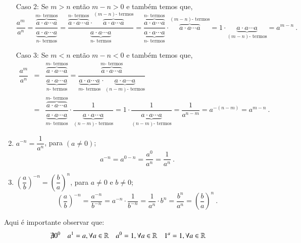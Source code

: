 \begin{enumerate}[P1)]
 Caso 2: Se $m > n$ então $m - n> 0$ e também temos que,
 \[\dfrac{a^m}{a^n}= \dfrac{\overbrace{a \cdot a \cdots a}^{m \text{- termos}}}{\underbrace{a \cdot a \cdots a}_{n \text{- termos}}}=
 \dfrac{\overbrace{a \cdot a \cdots a}^{n \text{- termos}} \cdot \overbrace{a \cdot a \cdots a}^{(m-n) \text{- termos}}}{\underbrace{a \cdot a \cdots a}_{n \text{- termos}}}=
 \frac{\overbrace{a \cdot a \cdots a}^{n \text{- termos}}}{\underbrace{a \cdot a \cdots a}_{n \text{- termos}}} \cdot \overbrace{a \cdot a \cdots a}^{(m-n) \text{- termos}} =
 1 \cdot \underbrace{a \cdot a \cdots a}_{(m-n) \text{- termos}}= a^{m-n} \ .\]

 Caso 3: Se $m < n$ então $m - n< 0$ e também temos que,
 \begin{eqnarray*}
  \dfrac{a^m}{a^n} &=&
 \dfrac{\overbrace{a \cdot a \cdots a}^{m \text{- termos}}}{\underbrace{a \cdot a \cdots a}_{n \text{- termos}}}=
 \dfrac{\overbrace{a \cdot a \cdots a}^{m \text{- termos}}}{\underbrace{a \cdot a \cdots a}_{m \text{- termos}} \cdot \underbrace{a \cdot a \cdots a}_{(n-m) \text{- termos}}} \\
 & = &\dfrac{\overbrace{a \cdot a \cdots a}^{m \text{- termos}}}{\underbrace{a \cdot a \cdots a}_{m \text{- termos}}} \cdot \dfrac{1}{\underbrace{a \cdot a \cdots a}_{(n-m) \text{- termos}}}=
 1 \cdot \dfrac{1}{\underbrace{a \cdot a \cdots a}_{(n-m) \text{- termos}}}= \dfrac{1}{a^{n-m}}= a^{-(n-m)}= a^{m-n} \ .
 \end{eqnarray*}


 \item $a^{-n}= \dfrac{1}{a^n}$, para $(a \neq 0)$;
 \[a^{-n}= a^{0-n}= \dfrac{a^0}{a^n}= \dfrac{1}{a^n} \ .\]

 \item $\left(\dfrac{a}{b} \right)^{-n}= \left(\dfrac{b}{a} \right)^{n}$, para $a \neq 0$ e $b \neq 0$;
 \[\left(\dfrac{a}{b} \right)^{-n}= \dfrac{a^{-n}}{b^{-n}}= a^{-n} \cdot \dfrac{1}{b^{-n}}= \dfrac{1}{a^n} \cdot b^{n}= \dfrac{b^n}{a^n}= \left(\dfrac{b}{a}\right)^n \ .\]

 \end{enumerate}

   \vskip0.3cm

 \colorbox{amarelo}{
 \begin{minipage}{0.9\linewidth}
 \begin{center}
 Aqui é importante observar que:
 \begin{align*}
 & \nexists 0^0 & & a^1= a, \forall a \in \mathbb{R} & & a^0= 1, \forall a \in \mathbb{R} & & 1^a= 1, \forall a \in \mathbb{R}
 \end{align*}
 \end{center}
 \end{minipage}}

